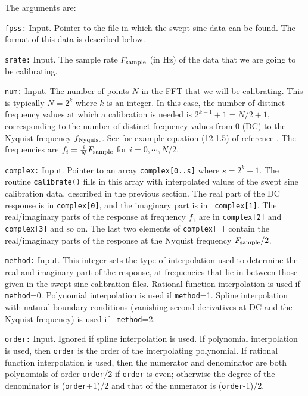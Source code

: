 The arguments are:
\begin{description}
\item{\tt fpss:} Input.  Pointer to the file in which the
  swept sine data can be found.  The format of this data is described
  below.
\item{\tt srate:} Input.  The sample rate $F_{\rm sample}$ (in Hz) of the data that
  we are going to be calibrating.
\item{\tt num:} Input.  The number of points $N$ in the FFT that we
 will be calibrating.  This is typically $N=2^k$ where $k$ is an
 integer.  In this case, the number of distinct frequency values at
 which a calibration is needed is $2^{k-1}+1 = N/2+1$, corresponding to
 the number of distinct frequency values from $0$ (DC) to the Nyquist
 frequency $f_{\rm Nyquist}$.  See for example equation (12.1.5) of
 reference \cite{NumRec}.  The frequencies are $f_i = {i \over N}
 F_{\rm sample}$ for $i=0,\cdots,N/2$.
\item{\tt complex:} Input.  Pointer to an array {\tt complex[0..s]}
  where $s=2^k+1$.  The routine {\tt  calibrate()} fills in this array
  with interpolated values of the swept sine calibration data,
  described in the previous section.  The real part of the DC response
  is in {\tt complex[0]}, and the imaginary part is in {\tt
  complex[1]}. The real/imaginary parts of the response at frequency
  $f_1$ are in {\tt complex[2]} and {\tt complex[3]} and so on.  The
  last two elements of {\tt complex[ ]} contain the real/imaginary parts
  of the response at the Nyquist frequency $F_{\rm sample}/2$.
\item{\tt method:} Input.  This integer sets the type of interpolation
  used to determine the real and imaginary part of the response, at
  frequencies that lie in between those given in the swept sine
  calibration files.  Rational function interpolation is used if {\tt
  method}=0.  Polynomial interpolation is used if {\tt method}=1.
  Spline interpolation with natural boundary conditions (vanishing
  second derivatives at DC and the Nyquist frequency) is used if {\tt
  method}=2.
\item{\tt order:}  Input.  Ignored if spline interpolation is used.
  If polynomial interpolation is used, then {\tt order} is the order
  of the interpolating polynomial.
  If rational function interpolation is used, then the numerator and
  denominator are both polynomials of order {\tt order}/2 if {\tt order}
  is even; otherwise the degree of the denominator is ({\tt order}+1)/2
  and that of the numerator is ({\tt order}-1)/2.
\end{description}

